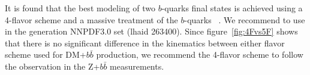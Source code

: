 It is found that the best modeling of two $b$-quarks final states is achieved using a 4-flavor scheme and a massive treatment of the $b$-quarks ~\cite{Chatrchyan:2014dha,Chatrchyan:2013zja,CMS:2015mba}. We recommend to use in the generation NNPDF3.0 set (lhaid 263400).
Since figure~\ref{fig:4Fvs5F} shows that there is no significant difference in the kinematics between 
either flavor scheme used for DM+$b\bar{b}$ production, we recommend the 4-flavor scheme to follow
the observation in the Z+$b\bar{b}$ measurements. 




